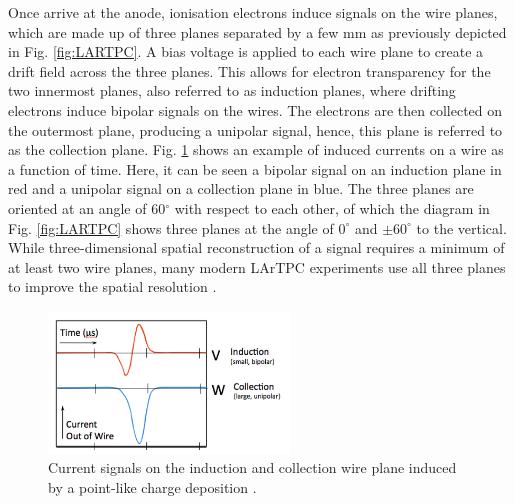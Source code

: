 Once arrive at the anode, ionisation electrons induce signals on the wire planes, which are made up of three planes separated by a few mm as previously depicted in Fig. \ref{fig:LARTPC}.
A bias voltage is applied to each wire plane to create a drift field across the three planes.
This allows for electron transparency for the two innermost planes, also referred to as induction planes, where drifting electrons induce bipolar signals on the wires.
The electrons are then collected on the outermost plane, producing a unipolar signal, hence, this plane is referred to as the collection plane.
Fig. \ref{fig:wire_current} shows an example of induced currents on a wire as a function of time.
Here, it can be seen a bipolar signal on an induction plane in red and a unipolar signal on a collection plane in blue.
The three planes are oriented at an angle of 60$^{\circ}$ with respect to each other, of which the diagram in Fig. \ref{fig:LARTPC} shows three planes at the angle of $0^{\circ}$ and $\pm60^{\circ}$ to the vertical.                                                                                                                                                                                          
While three-dimensional spatial reconstruction of a signal requires a minimum of at least two wire planes, many modern LArTPC experiments use all three planes to improve the spatial resolution \cite{argoneut, icarus_det, ubooneDet, sbnd_det, protodune, dunefd_det}.

\begin{figure}[ht] 
\centering    
\includegraphics[width=0.57\textwidth]{wire_current}
\caption[Induced Currents on an Induction and a Collection Wire Plane]{
Current signals on the induction and collection wire plane induced by a point-like charge deposition \cite{argoneut}.
\hfill
\break
}
\label{fig:wire_current}
\end{figure}


